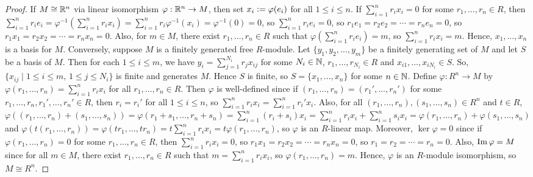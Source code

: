 \begin{proof}
    If $M \cong \mathbb{R}^{n}$ via linear isomorphism $\varphi : \mathbb{R}^{n} \to M$, then set $x_{i} \vcentcolon= \varphi(e_{i})$ for all $1 \leq i \leq n$. If $\sum_{i=1}^{n} r_{i}x_{i} = 0$ for some $r_{1},\ldots,r_{n} \in R$, then $\sum_{i=1}^{n} r_{i}e_{i} = \varphi^{-1}(\sum_{i=1}^{n} r_{i}x_{i}) = \sum_{i=1}^{n} r_{i}\varphi^{-1}(x_{i}) = \varphi^{-1}(0) = 0$, so $\sum_{i=1}^{n} r_{i}e_{i} = 0$, so $r_{1}e_{1} = r_{2}e_{2} = \cdots = r_{n}e_{n} = 0$, so $r_{1}x_{1} = r_{2}x_{2} = \cdots = r_{n}x_{n} = 0$. Also, for $m \in M$, there exist $r_{1},\ldots,r_{n} \in R$ such that $\varphi(\sum_{i=1}^{n} r_{i}e_{i}) = m$, so $\sum_{i=1}^{n} r_{i}x_{i} = m$. Hence, $x_{1},\ldots,x_{n}$ is a basis for $M$. Conversely, suppose $M$ is a finitely generated free $R$-module. Let $\{y_{1},y_{2},\ldots,y_{m}\}$ be a finitely generating set of $M$ and let $S$ be a basis of $M$. Then for each $1 \leq i \leq m$, we have $y_{i} = \sum_{j=1}^{N_{i}} r_{j}x_{ij}$ for some $N_{i} \in \mathbb{N}$, $r_{1},\ldots,r_{N_{i}} \in R$ and $x_{i1},\ldots,x_{iN_{i}} \in S$. So, $\{x_{ij} \mid 1 \leq i \leq m, \, 1 \leq j \leq N_{i}\}$ is finite and generates $M$. Hence $S$ is finite, so $S = \{x_{1},\ldots,x_{n}\}$ for some $n \in \mathbb{N}$. Define $\varphi : R^{n} \to M$ by $\varphi(r_{1},\ldots,r_{n}) = \sum_{i=1}^{n} r_{i}x_{i}$ for all $r_{1},\ldots,r_{n} \in R$. Then $\varphi$ is well-defined since if $(r_{1},\ldots,r_{n}) = (r_{1}',\ldots,r_{n}')$ for some $r_{1},\ldots,r_{n},r_{1}',\ldots,r_{n}' \in R$, then $r_{i} = r_{i}'$ for all $1 \leq i \leq n$, so $\sum_{i=1}^{n} r_{i}x_{i} = \sum_{i=1}^{n} r_{i}'x_{i}$. Also, for all $(r_{1},\ldots,r_{n}), (s_{1},\ldots,s_{n}) \in R^{n}$ and $t \in R$, $\varphi((r_{1},\ldots,r_{n}) + (s_{1},\ldots,s_{n})) = \varphi(r_{1}+s_{1},\ldots,r_{n}+s_{n}) = \sum_{i=1}^{n} (r_{i}+s_{i})x_{i} = \sum_{i=1}^{n} r_{i}x_{i} + \sum_{i=1}^{n} s_{i}x_{i} = \varphi(r_{1},\ldots,r_{n}) + \varphi(s_{1},\ldots,s_{n})$ and $\varphi(t(r_{1},\ldots,r_{n})) = \varphi(tr_{1},\ldots,tr_{n}) = t\sum_{i=1}^{n} r_{i}x_{i} = t\varphi(r_ {1},\ldots,r_ {n})$, so $\varphi$ is an $R$-linear map. Moreover, $\ker \varphi = 0$ since if $\varphi(r_{1},\ldots,r_{n}) = 0$ for some $r_{1},\ldots,r_{n} \in R$, then $\sum_{i=1}^{n} r_{i}x_{i} = 0$, so $r_{1}x_{1} = r_{2}x_{2} = \cdots = r_{n}x_{n} = 0$, so $r_{1} = r_{2} = \cdots = r_{n} = 0$. Also, $\operatorname{Im} \varphi = M$ since for all $m \in M$, there exist $r_{1},\ldots,r_{n} \in R$ such that $m = \sum_{i=1}^{n} r_{i}x_{i}$, so $\varphi(r_{1},\ldots,r_{n}) = m$. Hence, $\varphi$ is an $R$-module isomorphism, so $M \cong R^{n}$.
\end{proof}

